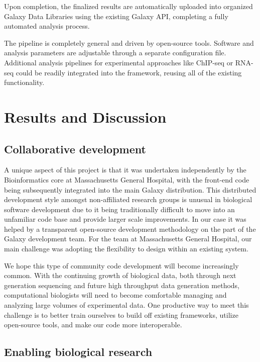 \documentclass[10pt]{bmc_article}
\newenvironment{bmcformat}{\begin{raggedright}\baselineskip20pt\sloppy\setboolean{publ}{false}}{\end{raggedright}\baselineskip20pt\sloppy}
\begin{document}
\begin{bmcformat}
Upon completion, the finalized results are automatically uploaded into
organized Galaxy Data Libraries using the existing Galaxy API,
completing a fully automated analysis process.

The pipeline is completely general and driven by open-source
tools. Software and analysis parameters are adjustable through a
separate configuration file. Additional analysis pipelines for
experimental approaches like ChIP-seq or RNA-seq could be readily
integrated into the framework, reusing all of the existing
functionality.

\section*{Results and Discussion}

\subsection*{Collaborative development}

A unique aspect of this project is that it was undertaken
independently by the Bioinformatics core at Massachusetts General
Hospital, with the front-end code being subsequently integrated
into the main Galaxy distribution. This distributed development style
amongst non-affiliated research groups is unusual in biological software
development due to it being traditionally difficult to move into an
unfamiliar code base and provide larger scale improvements. In our
case it was helped by a transparent open-source development
methodology on the part of the Galaxy development team. For the team
at Massachusetts General Hospital, our main challenge was adopting
the flexibility to design within an existing system.

We hope this type of community code development will become
increasingly common. With the continuing growth of biological data,
both through next generation sequencing and future high throughput
data generation methods, computational biologists will need to become
comfortable managing and analyzing large volumes of experimental
data. One productive way to meet this challenge is to better train
ourselves to build off existing frameworks, utilize open-source tools,
and make our code more interoperable.

\subsection*{Enabling biological research}


\end{bmcformat}
\end{document}
